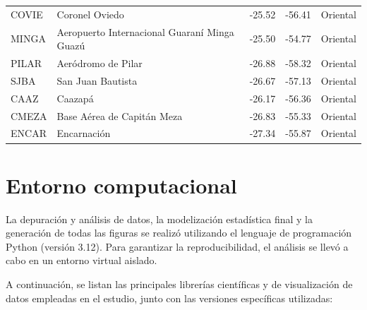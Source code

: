 \begin{table}[htbp]
{\begin{tabular}{llrrl}
    COVIE    & Coronel Oviedo                              & -25.52 & -56.41 & Oriental \\
    MINGA    & Aeropuerto Internacional Guaraní Minga Guazú& -25.50 & -54.77 & Oriental \\
    PILAR    & Aeródromo de Pilar                          & -26.88 & -58.32 & Oriental \\
    SJBA     & San Juan Bautista                           & -26.67 & -57.13 & Oriental \\
    CAAZ     & Caazapá                                     & -26.17 & -56.36 & Oriental \\
    CMEZA    & Base Aérea de Capitán Meza                  & -26.83 & -55.33 & Oriental \\
    ENCAR    & Encarnación                                 & -27.34 & -55.87 & Oriental \\
    \bottomrule\bottomrule
    \end{tabular}
    }
\end{table}

\chapter{Entorno computacional}\label{apendice:entorno}

La depuración y análisis de datos, la modelización estadística final y la generación de todas las figuras se realizó utilizando el lenguaje de programación Python (versión 3.12). Para garantizar la reproducibilidad, el análisis se llevó a cabo en un entorno virtual aislado.

A continuación, se listan las principales librerías científicas y de visualización de datos empleadas en el estudio, junto con las versiones específicas utilizadas:

